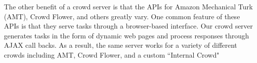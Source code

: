The other benefit of a crowd server is that the APIs for Amazon Mechanical Turk (AMT), Crowd Flower, and others greatly vary.
One common feature of these APIs is that they serve tasks through a browser-based interface.
Our crowd server generates tasks in the form of dynamic web pages and process responses through AJAX call backs.
As a result, the same server works for a variety of different crowds including AMT, Crowd Flower, and a custom ``Internal Crowd"